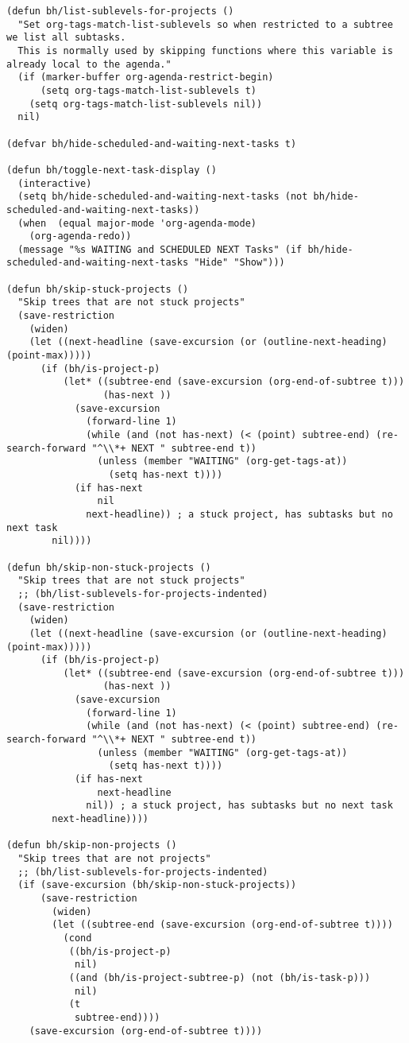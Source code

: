 \documentclass[11pt]{scrartcl}
\begin{document}
\begin{verbatim}
(defun bh/list-sublevels-for-projects ()
  "Set org-tags-match-list-sublevels so when restricted to a subtree we list all subtasks.
  This is normally used by skipping functions where this variable is already local to the agenda."
  (if (marker-buffer org-agenda-restrict-begin)
      (setq org-tags-match-list-sublevels t)
    (setq org-tags-match-list-sublevels nil))
  nil)

(defvar bh/hide-scheduled-and-waiting-next-tasks t)

(defun bh/toggle-next-task-display ()
  (interactive)
  (setq bh/hide-scheduled-and-waiting-next-tasks (not bh/hide-scheduled-and-waiting-next-tasks))
  (when  (equal major-mode 'org-agenda-mode)
    (org-agenda-redo))
  (message "%s WAITING and SCHEDULED NEXT Tasks" (if bh/hide-scheduled-and-waiting-next-tasks "Hide" "Show")))

(defun bh/skip-stuck-projects ()
  "Skip trees that are not stuck projects"
  (save-restriction
    (widen)
    (let ((next-headline (save-excursion (or (outline-next-heading) (point-max)))))
      (if (bh/is-project-p)
          (let* ((subtree-end (save-excursion (org-end-of-subtree t)))
                 (has-next ))
            (save-excursion
              (forward-line 1)
              (while (and (not has-next) (< (point) subtree-end) (re-search-forward "^\\*+ NEXT " subtree-end t))
                (unless (member "WAITING" (org-get-tags-at))
                  (setq has-next t))))
            (if has-next
                nil
              next-headline)) ; a stuck project, has subtasks but no next task
        nil))))

(defun bh/skip-non-stuck-projects ()
  "Skip trees that are not stuck projects"
  ;; (bh/list-sublevels-for-projects-indented)
  (save-restriction
    (widen)
    (let ((next-headline (save-excursion (or (outline-next-heading) (point-max)))))
      (if (bh/is-project-p)
          (let* ((subtree-end (save-excursion (org-end-of-subtree t)))
                 (has-next ))
            (save-excursion
              (forward-line 1)
              (while (and (not has-next) (< (point) subtree-end) (re-search-forward "^\\*+ NEXT " subtree-end t))
                (unless (member "WAITING" (org-get-tags-at))
                  (setq has-next t))))
            (if has-next
                next-headline
              nil)) ; a stuck project, has subtasks but no next task
        next-headline))))

(defun bh/skip-non-projects ()
  "Skip trees that are not projects"
  ;; (bh/list-sublevels-for-projects-indented)
  (if (save-excursion (bh/skip-non-stuck-projects))
      (save-restriction
        (widen)
        (let ((subtree-end (save-excursion (org-end-of-subtree t))))
          (cond
           ((bh/is-project-p)
            nil)
           ((and (bh/is-project-subtree-p) (not (bh/is-task-p)))
            nil)
           (t
            subtree-end))))
    (save-excursion (org-end-of-subtree t))))


\end{verbatim}
\end{document}
